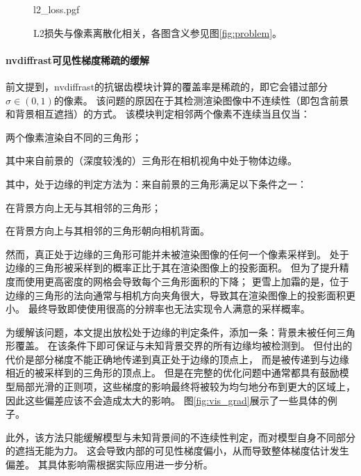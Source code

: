 \begin{figure}
    \centering
    {l2_loss.pgf}
    \caption[L2损失与像素离散化相关]{L2损失与像素离散化相关，各图含义参见图\ref{fig:problem}。}
    \label{fig:l2_loss}
\end{figure}

\paragraph{nvdiffrast可见性梯度稀疏的缓解}
前文提到，nvdiffrast的抗锯齿模块计算的覆盖率是稀疏的，即它会错过部分$\sigma\in(0,1)$的像素。
该问题的原因在于其检测渲染图像中不连续性（即包含前景和背景相互遮挡）的方式。
该模块判定相邻两个像素不连续当且仅当：
\begin{enumerate*}
\item 两个像素渲染自不同的三角形；
\item 其中来自前景的（深度较浅的）三角形在相机视角中处于物体边缘。
\end{enumerate*}
其中，处于边缘的判定方法为：来自前景的三角形满足以下条件之一：
\begin{enumerate*}
\item 在背景方向上无与其相邻的三角形；
\item 在背景方向上与其相邻的三角形朝向相机背面。
\end{enumerate*}
然而，真正处于边缘的三角形可能并未被渲染图像的任何一个像素采样到。
处于边缘的三角形被采样到的概率正比于其在渲染图像上的投影面积。
但为了提升精度而使用更高密度的网格会导致每个三角形面积的下降；
更雪上加霜的是，位于边缘的三角形的法向通常与相机方向夹角很大，导致其在渲染图像上的投影面积更小。
最终导致即使使用很高的分辨率也无法实现令人满意的采样概率。

为缓解该问题，本文提出放松处于边缘的判定条件，添加一条：背景未被任何三角形覆盖。
在该条件下即可保证与未知背景交界的所有边缘均被检测到。
但付出的代价是部分梯度不能正确地传递到真正处于边缘的顶点上，
而是被传递到与边缘相近的被采样到的三角形的顶点上。
但是在完整的优化问题中通常都具有鼓励模型局部光滑的正则项，这些梯度的影响最终将被较为均匀地分布到更大的区域上，因此这些偏差应该不会造成太大的影响。
图\ref{fig:vis_grad}展示了一些具体的例子。

此外，该方法只能缓解模型与未知背景间的不连续性判定，而对模型自身不同部分的遮挡无能为力。
这会导致内部的可见性梯度偏小，从而导致整体梯度估计发生偏差。
其具体影响需根据实际应用进一步分析。

